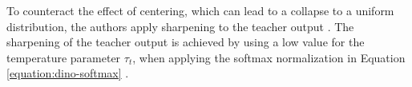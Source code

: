 To counteract the effect of centering, which can lead to a collapse to a uniform distribution, the authors apply sharpening to the teacher output \citep{Caron2021}.
The sharpening of the teacher output is achieved by using a low value for the temperature parameter $\tau_t$, when applying the softmax normalization in Equation \ref{equation:dino-softmax} \citep{Caron2021}.
